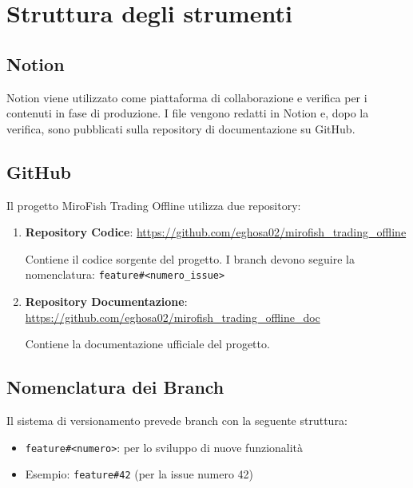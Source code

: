\section{Struttura degli strumenti}

\subsection{Notion}
Notion viene utilizzato come piattaforma di collaborazione e verifica per i contenuti in fase di produzione. I file vengono redatti in Notion e, dopo la verifica, sono pubblicati sulla repository di documentazione su GitHub.

\subsection{GitHub}
Il progetto MiroFish Trading Offline utilizza due repository:

\begin{enumerate}
  \item \textbf{Repository Codice}: \url{https://github.com/eghosa02/mirofish_trading_offline}
  
  Contiene il codice sorgente del progetto. I branch devono seguire la nomenclatura: \texttt{feature\#<numero\_issue>}
  
  \item \textbf{Repository Documentazione}: \url{https://github.com/eghosa02/mirofish_trading_offline_doc}
  
  Contiene la documentazione ufficiale del progetto.
\end{enumerate}

\subsection{Nomenclatura dei Branch}
Il sistema di versionamento prevede branch con la seguente struttura:
\begin{itemize}
  \item \texttt{feature\#<numero>}: per lo sviluppo di nuove funzionalità
  \item Esempio: \texttt{feature\#42} (per la issue numero 42)
\end{itemize}

